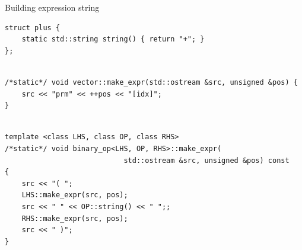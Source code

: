 \documentclass[@BEAMER_OPTIONS@]{beamer}
\begin{document}
\note{ }

\begin{frame}[fragile]{Building expression string}
    \begin{exampleblock}{}
        \begin{lstlisting}
struct plus {
    static std::string string() { return "+"; }
};
        \end{lstlisting}
        \pause
        \begin{lstlisting}[firstnumber=last]

/*static*/ void vector::make_expr(std::ostream &src, unsigned &pos) {
    src << "prm" << ++pos << "[idx]";
}
        \end{lstlisting}
        \pause
        \begin{lstlisting}[firstnumber=last]

template <class LHS, class OP, class RHS>
/*static*/ void binary_op<LHS, OP, RHS>::make_expr(
                            std::ostream &src, unsigned &pos) const
{
    src << "( ";
    LHS::make_expr(src, pos);
    src << " " << OP::string() << " ";;
    RHS::make_expr(src, pos);
    src << " )";
}
        \end{lstlisting}
    \end{exampleblock}
\end{frame}

\note{ }
\end{document}
